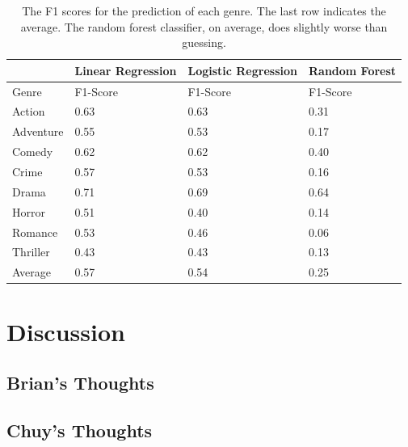 \documentclass[11pt]{article}
\begin{document}
\begin{table}[h]
	\label{tab:lda_tfidf_scores}
\begin{center}
	\begin{tabular}{| l | l | l | l |}
		\hline
		           & Linear Regression & Logistic Regression & Random Forest \\
		\hline
		Genre      & F1-Score          & F1-Score            & F1-Score       \\
	  	\hline			
	  	Action     & 0.63              & 0.63                & 0.31 \\
	  	Adventure  & 0.55              & 0.53                & 0.17 \\ 
	  	Comedy     & 0.62              & 0.62                & 0.40 \\
	  	Crime      & 0.57              & 0.53                & 0.16 \\
	  	Drama      & 0.71              & 0.69                & 0.64 \\
	  	Horror     & 0.51              & 0.40                & 0.14 \\
	  	Romance    & 0.53              & 0.46                & 0.06 \\
	  	Thriller   & 0.43              & 0.43                & 0.13 \\
	  	\hline
	  	Average    & 0.57              & 0.54                & 0.25 \\
	  \hline  
	\end{tabular}
\end{center}
	\caption{The F1 scores for the prediction of each genre. The last row indicates the average. The random forest classifier, on average, does slightly worse than guessing.}
\end{table}

\section{Discussion}
\label{sec:discussion}

\subsection{Brian's Thoughts}

\subsection{Chuy's Thoughts}

{}

\end{document}
